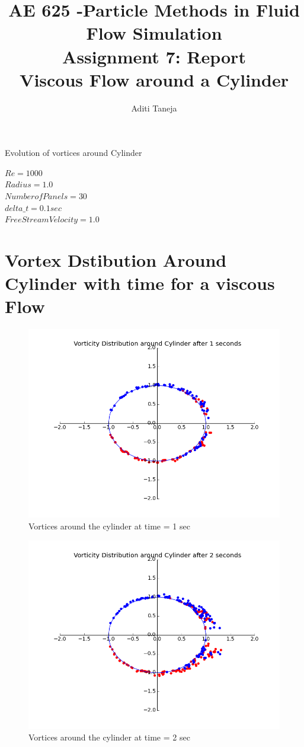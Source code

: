\documentclass{article}
\title{AE 625 -Particle Methods in Fluid Flow Simulation \\ Assignment 7: Report \\ Viscous Flow around a Cylinder}
\author{Aditi Taneja}
\date{}
\begin{document}
\maketitle

Evolution of vortices around Cylinder

$Re = 1000 $ 
\\
$Radius = 1.0 $
\\
$Number of Panels = 30$
\\
$delta\_t = 0.1 sec$
\\
$Free Stream Velocity = 1.0$

\section{Vortex Dstibution Around Cylinder with time for a viscous Flow}

\begin{figure}[H]   \label{figure}
\includegraphics[width=12cm]{one.png}
\caption{Vortices around the cylinder at time = 1 sec}
\label{figure:}
\end{figure}

\begin{figure}[H]   \label{figure}
\includegraphics[width=12cm]{two.png}
\caption{Vortices around the cylinder at time = 2 sec}
\label{figure:}
\end{figure}
\end{document}
